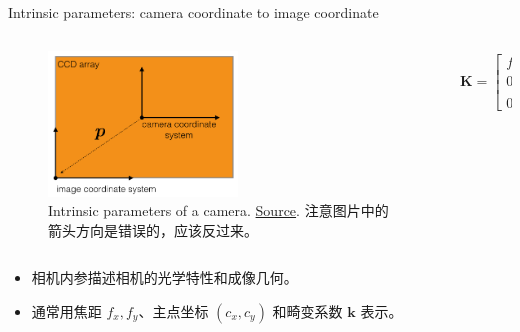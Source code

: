 \documentclass[10pt,xcolor={table,dvipsnames},t]{beamer}
\begin{document}
\begin{frame}{Intrinsic parameters: camera coordinate to image coordinate}
  \begin{columns}
    \begin{column}{0.6\textwidth}
      \begin{figure}
        \centering
        \includegraphics[width=0.55\textwidth]{figures/intrinsic-parameters.png}
        \caption{Intrinsic parameters of a camera. \href{https://www.cs.cmu.edu/~16385/s17/Slides/11.1\_Camera\_matrix.pdf}{Source}. 注意图片中的箭头方向是错误的，应该反过来。}
      \end{figure}
    \end{column}
    
    \begin{column}{0.4\textwidth}
      \begin{align*}
        \mathbf{K} = \begin{bmatrix}
        f_x & 0 & c_x \\
        0 & f_y & c_y \\
        0 & 0 & 1
        \end{bmatrix}.
      \end{align*}
    \end{column}
  \end{columns}

  \begin{itemize}
    \item 相机内参描述相机的光学特性和成像几何。
    \item 通常用焦距 $f_x, f_y$、主点坐标 $(c_x, c_y)$ 和畸变系数 $\mathbf{k}$ 表示。
  \end{itemize}
\end{frame}
\end{document}
